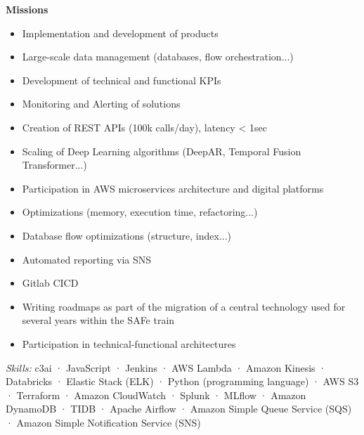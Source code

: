 \documentclass[10pt, a4paper]{article}
\newcommand{\spaceaftersection}{1em}
\newcommand{\newsectionspace}{
\begin{minipage}[t]{\linegoal}
\hfill
\vspace{\spaceaftersection}
\end{minipage}
}
\begin{document}
{{        \textbf{Missions}
        \begin{itemize}
            \item Implementation and development of products
            \item Large-scale data management (databases, flow orchestration...)
            \item Development of technical and functional KPIs
            \item Monitoring and Alerting of solutions
            \item Creation of REST APIs (100k calls/day), latency < 1sec
            \item Scaling of Deep Learning algorithms (DeepAR, Temporal Fusion Transformer...) 
            \item Participation in AWS microservices architecture and digital platforms
            \item Optimizations (memory, execution time, refactoring...)
            \item Database flow optimizations (structure, index...)
            \item Automated reporting via SNS
            \item Gitlab CICD
            \item Writing roadmaps as part of the migration of a central technology used for several years within the SAFe train
            \item Participation in technical-functional architectures
        \end{itemize}

        \textit{Skills:} c3ai · JavaScript · Jenkins · AWS Lambda · Amazon Kinesis · Databricks · Elastic Stack (ELK) · Python (programming language) · AWS S3 · Terraform · Amazon CloudWatch · Splunk · MLflow · Amazon DynamoDB · TIDB · Apache Airflow · Amazon Simple Queue Service (SQS) · Amazon Simple Notification Service (SNS)
    }
}
\newsectionspace
\end{document}
